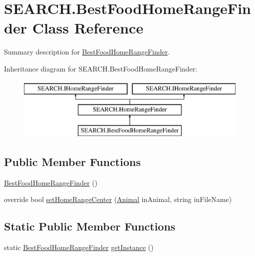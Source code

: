 \hypertarget{class_s_e_a_r_c_h_1_1_best_food_home_range_finder}{\section{S\-E\-A\-R\-C\-H.\-Best\-Food\-Home\-Range\-Finder Class Reference}
\label{class_s_e_a_r_c_h_1_1_best_food_home_range_finder}
}


Summary description for \hyperlink{class_s_e_a_r_c_h_1_1_best_food_home_range_finder}{Best\-Food\-Home\-Range\-Finder}.  


Inheritance diagram for S\-E\-A\-R\-C\-H.\-Best\-Food\-Home\-Range\-Finder\-:\begin{figure}[H]
\begin{center}
\leavevmode
\includegraphics[height=3.000000cm]{class_s_e_a_r_c_h_1_1_best_food_home_range_finder}
\end{center}
\end{figure}
\subsection*{Public Member Functions}
\begin{DoxyCompactItemize}
\item 
\hyperlink{class_s_e_a_r_c_h_1_1_best_food_home_range_finder_aafefcd8a92bb988b9a1f4be2295089ec}{Best\-Food\-Home\-Range\-Finder} ()
\item 
override bool \hyperlink{class_s_e_a_r_c_h_1_1_best_food_home_range_finder_aa9876f866a2bc8ffca635caafb20add3}{set\-Home\-Range\-Center} (\hyperlink{class_s_e_a_r_c_h_1_1_animal}{Animal} in\-Animal, string in\-File\-Name)
\end{DoxyCompactItemize}
\subsection*{Static Public Member Functions}
\begin{DoxyCompactItemize}
\item 
static \hyperlink{class_s_e_a_r_c_h_1_1_best_food_home_range_finder}{Best\-Food\-Home\-Range\-Finder} \hyperlink{class_s_e_a_r_c_h_1_1_best_food_home_range_finder_a4fba25395fd682c52dfceb20a1944309}{get\-Instance} ()
\end{DoxyCompactItemize}
